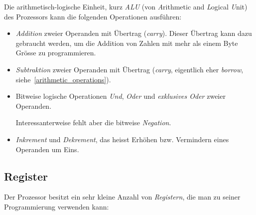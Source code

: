 \documentclass[11pt]{scrartcl}
\begin{document}
Die arithmetisch-logische Einheit, kurz \emph{ALU} (von
\emph{A}rithmetic and \emph{L}ogical \emph{U}nit) des Prozessors kann
die folgenden Operationen ausführen:

\begin{itemize}
\item \emph{Addition} zweier Operanden mit Übertrag
  (\emph{carry}). Dieser Übertrag kann dazu gebraucht werden, um die
  Addition von Zahlen mit mehr als einem Byte Grösse zu programmieren.
    
\item \emph{Subtraktion} zweier Operanden mit Übertrag (\emph{carry},
  eigentlich eher \emph{borrow}, siehe~\ref{arithmetic_operations}).
\item Bitweise logische Operationen \emph{Und}, \emph{Oder} und
  \emph{exklusives Oder} zweier Operanden.
    
  Interessanterweise fehlt aber die bitweise \emph{Negation}.
\item \emph{Inkrement} und \emph{Dekrement}, das heisst Erhöhen
  bzw. Vermindern eines Operanden um Eins.
\end{itemize}

\subsection{Register}
\label{sec:register}


Der Prozessor besitzt ein sehr kleine Anzahl von
\emph{Registern}, die man zu seiner Programmierung verwenden kann:
\end{document}
